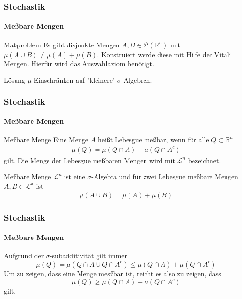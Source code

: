 \documentclass{beamer}
\begin{document}
\begin{frame}
    \frametitle{Stochastik}
\framesubtitle{Meßbare Mengen}
    \begin{block}{Maßproblem}
Es gibt disjunkte Mengen  $A,B \in \mathcal{P}(\mathbb{R}^n)$ mit $\mu(A \cup B) \neq \mu(A) + \mu(B)$. Konstruiert werde diese mit Hilfe der 
\href{https://www.youtube.com/watch?v=SJ8YoV6YZFA}{Vitali Mengen}. Hierfür wird das Auswahlaxiom benötigt.
\end{block}

    \begin{block}{Lösung}
$\mu$ Einschränken auf "kleinere" $\sigma$-Algebren.
\end{block}

 \end{frame}


\begin{frame}
    \frametitle{Stochastik}
\framesubtitle{Meßbare Mengen}
    \begin{block}{Meßbare Menge}
Eine Menge $A$ heißt Lebesgue meßbar, wenn für alle $Q \subset \mathbb{R}^n$
\begin{align*}
\mu(Q) = \mu(Q \cap A) + \mu(Q \cap A^c)  
\end{align*}
gilt. Die Menge der Lebesgue meßbaren Mengen wird mit $\mathcal{L}^n$ bezeichnet.
\end{block}


    \begin{block}{Meßbare Menge}
$\mathcal{L}^n$ ist eine $\sigma$-Algebra und für  zwei Lebesgue meßbare Mengen  $A,B \in \mathcal{L}^n$ ist
\begin{align*}
 \mu(A \cup B) = \mu(A) + \mu(B)
\end{align*}

\end{block}

 \end{frame}


 \begin{frame}
    \frametitle{Stochastik}
\framesubtitle{Meßbare Mengen}
Aufgrund der $\sigma$-subadditivität gilt immer
$$ \mu(Q) = \mu(Q \cap A \cup Q \cap A^c) \leq \mu(Q \cap A) +  \mu(Q \cap A^c) $$
Um zu zeigen, dass eine Menge mesßbar ist, reicht es also zu zeigen, dass 
$$\mu(Q)  \geq \mu(Q \cap A) +  \mu(Q \cap A^c) $$
gilt.
\end{frame}
\end{document}
